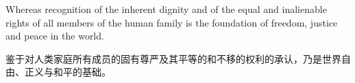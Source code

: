 \documentclass{ctexart}
\begin{document}
{
Whereas recognition of the inherent dignity and of the equal and inalienable rights of all members of the human family is the foundation of freedom, justice and peace in the world.

鉴于对人类家庭所有成员的固有尊严及其平等的和不移的权利的承认，乃是世界自由、正义与和平的基础。
}

\begin{center}
\end{center}
\end{document}
